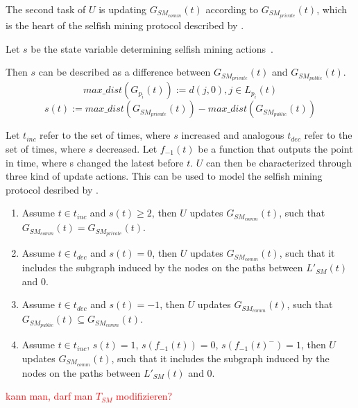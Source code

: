 The second task of $U$ is updating $G_{SM_{comm}}(t)$ according to $G_{SM_{private}}(t)$, which is the heart of the selfish mining protocol described by \citep{eyal}.

Let $s$ be the state variable determining selfish mining actions~\citep{eyal}.

Then $s$ can be described as a difference between $G_{SM_{private}}(t)$ and $G_{SM_{public}}(t)$.
\begin{equation}
max\_ dist(G_{p_i}(t)) := d(j,0), j \in L_{p_i}(t)
\end{equation}
\begin{equation}
s(t) := max\_ dist(G_{SM_{private}}(t)) - max\_ dist(G_{SM_{public}}(t))
\end{equation}

Let $t_{inc}$ refer to the set of times, where $s$ increased and analogous $t_{dec}$ refer to the set of times, where $s$ decreased.
Let $f_{-1}(t)$ be a function that outputs the point in time, where s changed the latest before $t$.
$U$ can then be characterized through three kind of update actions. This can be used to model the selfish mining protocol desribed by \citeauthor{eyal}.
\begin{enumerate}
\small
\item Assume $t \in t_{inc}$ and $s(t) \geq 2$, then $U$ updates $G_{SM_{comm}}(t)$, such that $G_{SM_{comm}}(t) = G_{SM_{private}}(t)$.
\item Assume $t \in t_{dec}$ and $s(t) = 0$, then $U$ updates $G_{SM_{comm}}(t)$, such that it includes the subgraph induced by the nodes on the paths between $L'_{SM}(t)$ and ${0}$.
\item Assume $t \in t_{dec}$ and $s(t) = -1$, then $U$ updates $G_{SM_{comm}}(t)$, such that $G_{SM_{public}}(t) \subseteq G_{SM_{comm}}(t)$.
\item Assume $t \in t_{inc}$, $s(t) = 1$, $s(f_{-1}(t)) = 0$, $s(f_{-1}(t)^-) = 1$, then $U$ updates $G_{SM_{comm}}(t)$, such that it includes the subgraph induced by the nodes on the paths between $L'_{SM}(t)$ and ${0}$.
\end{enumerate}

\textcolor{red}{ kann man, darf man $T_{SM}$ modifizieren?}









